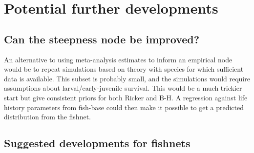 \documentclass{dragonfly-report}\usepackage[]{graphicx}\usepackage[]{color}
\begin{document}
\section{Potential further developments}

\subsection{Can the steepness node be improved?}

An alternative to using meta-analysis estimates to inform an empirical node would be to repeat simulations based on theory \citep{mangel_2010_reproductive, mangel2013perspective} with species for which sufficient data is available. This subset is probably small, and the simulations would require assumptions about larval/early-juvenile survival. This would be a much trickier start but give consistent priors for both Ricker and B-H. A regression against life history parameters from fish-base could then make it possible to get a predicted distribution from the fishnet. 

\subsection{Suggested developments for fishnets}

\printbibliography
\end{document}
